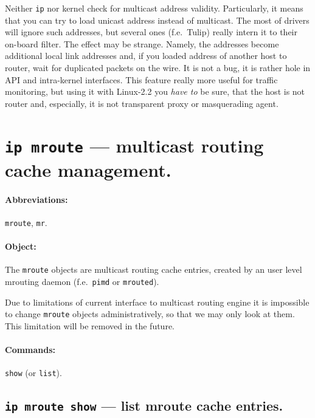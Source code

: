 \begin{NB}
 Neither \verb|ip| nor kernel check for multicast address validity.
 Particularly, it means that you can try to load unicast address
 instead of multicast. The most of drivers will ignore such addresses,
 but several ones (f.e.\ Tulip) really intern it to their on-board filter.
 The effect may be strange. Namely, the addresses become additional
 local link addresses and, if you loaded address of another host
 to router, wait for duplicated packets on the wire.
 It is not a bug, it is rather hole in API and intra-kernel interfaces.
 This feature really more useful for traffic monitoring, but using it
 with Linux-2.2 you {\em have to\/} be sure, that the host is not
 router and, especially, it is not transparent proxy or masquerading
 agent.
\end{NB}



\section{{\tt ip mroute} --- multicast routing cache management.}
\label{IP-MROUTE}

\paragraph{Abbreviations:} \verb|mroute|, \verb|mr|.

\paragraph{Object:} The \verb|mroute| objects are multicast routing cache
entries, created by an user level mrouting daemon
(f.e.\ \verb|pimd| or \verb|mrouted|).

Due to limitations of current interface to multicast routing
engine it is impossible to change \verb|mroute| objects administratively,
so that we may only look at them. This limitation will be removed
in the future.

\paragraph{Commands:} \verb|show| (or \verb|list|).


\subsection{{\tt ip mroute show} --- list mroute cache entries.}

